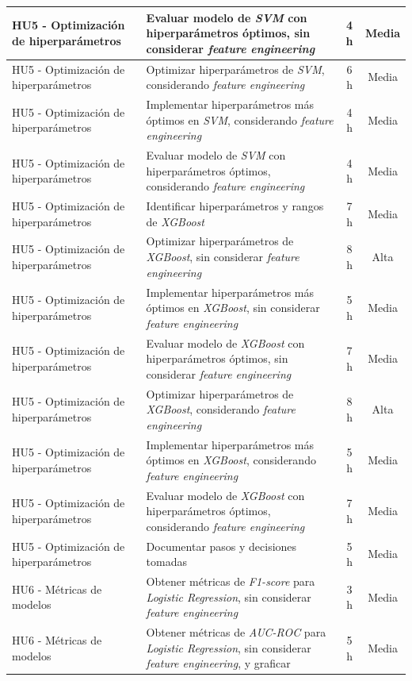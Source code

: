 \documentclass[
11pt, %
]{charter}
\begin{document}
\begin{xltabular}{\linewidth}{@{}|X|X|c|c|@{}}
HU5 - Optimización de hiperparámetros & Evaluar modelo de \textit{SVM} con hiperparámetros óptimos, sin considerar \textit{feature engineering} & 4 h & Media \\ \hline
HU5 - Optimización de hiperparámetros & Optimizar hiperparámetros de \textit{SVM}, considerando \textit{feature engineering} & 6 h & Media \\ \hline
HU5 - Optimización de hiperparámetros & Implementar hiperparámetros más óptimos en \textit{SVM}, considerando \textit{feature engineering} & 4 h & Media \\ \hline
HU5 - Optimización de hiperparámetros & Evaluar modelo de \textit{SVM} con hiperparámetros óptimos, considerando \textit{feature engineering} & 4 h & Media \\ \hline
HU5 - Optimización de hiperparámetros & Identificar hiperparámetros y rangos de \textit{XGBoost} & 7 h & Media \\ \hline
HU5 - Optimización de hiperparámetros & Optimizar hiperparámetros de \textit{XGBoost}, sin considerar \textit{feature engineering} & 8 h & Alta \\ \hline
HU5 - Optimización de hiperparámetros & Implementar hiperparámetros más óptimos en \textit{XGBoost}, sin considerar \textit{feature engineering} & 5 h & Media \\ \hline
HU5 - Optimización de hiperparámetros & Evaluar modelo de \textit{XGBoost} con hiperparámetros óptimos, sin considerar \textit{feature engineering} & 7 h & Media \\ \hline
HU5 - Optimización de hiperparámetros & Optimizar hiperparámetros de \textit{XGBoost}, considerando \textit{feature engineering} & 8 h & Alta \\ \hline
HU5 - Optimización de hiperparámetros & Implementar hiperparámetros más óptimos en \textit{XGBoost}, considerando \textit{feature engineering} & 5 h & Media \\ \hline
HU5 - Optimización de hiperparámetros & Evaluar modelo de \textit{XGBoost} con hiperparámetros óptimos, considerando \textit{feature engineering} & 7 h & Media \\ \hline
HU5 - Optimización de hiperparámetros & Documentar pasos y decisiones tomadas & 5 h & Media \\ \hline
HU6 - Métricas de modelos & Obtener métricas de \textit{F1-score} para \textit{Logistic Regression}, sin  considerar \textit{feature engineering} & 3 h & Media \\ \hline
HU6 - Métricas de modelos & Obtener métricas de \textit{AUC-ROC} para \textit{Logistic Regression}, sin  considerar \textit{feature engineering}, y graficar & 5 h & Media \\ \hline

\end{xltabular}
\end{document}
